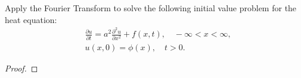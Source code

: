 \begin{problem}{5}
  Apply the Fourier Transform to solve the following initial value problem for the heat equation:
  \begin{align*}
    &\frac{\partial u}{\partial t} = a^2 \frac{\partial^2 u}{\partial x^2} + f(x, t), \quad -\infty < x < \infty,\\
    &u(x, 0) = \phi(x), \quad t >0.
  \end{align*}
\end{problem}

\begin{proof}
\end{proof}
\newpage
